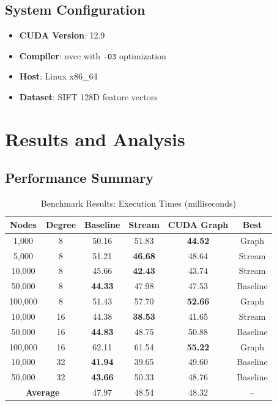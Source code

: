 \documentclass[11pt,a4paper]{article}
\begin{document}
\subsection{System Configuration}

\begin{tcolorbox}[colback=gray!5!white,colframe=gray!75!black,title=Test Environment]
\begin{itemize}
    \item \textbf{CUDA Version}: 12.9
    \item \textbf{Compiler}: nvcc with \texttt{-O3} optimization
    \item \textbf{Host}: Linux x86\_64
    \item \textbf{Dataset}: SIFT 128D feature vectors
\end{itemize}
\end{tcolorbox}

\section{Results and Analysis}

\subsection{Performance Summary}

\begin{table}[H]
\centering
\caption{Benchmark Results: Execution Times (milliseconds)}
\small
\begin{tabular}{@{}cccccc@{}}
\toprule
\textbf{Nodes} & \textbf{Degree} & \textbf{Baseline} & \textbf{Stream} & \textbf{CUDA Graph} & \textbf{Best} \\ \midrule
1,000      & 8  & 50.16 & 51.83 & \textbf{44.52} & Graph   \\
5,000      & 8  & 51.21 & \textbf{46.68} & 48.64 & Stream  \\
10,000     & 8  & 45.66 & \textbf{42.43} & 43.74 & Stream  \\
50,000     & 8  & \textbf{44.33} & 47.98 & 47.53 & Baseline \\
100,000    & 8  & 51.43 & 57.70 & \textbf{52.66} & Graph   \\
10,000     & 16 & 44.38 & \textbf{38.53} & 41.65 & Stream  \\
50,000     & 16 & \textbf{44.83} & 48.75 & 50.88 & Baseline \\
100,000    & 16 & 62.11 & 61.54 & \textbf{55.22} & Graph   \\
10,000     & 32 & \textbf{41.94} & 39.65 & 49.60 & Baseline \\
50,000     & 32 & \textbf{43.66} & 50.33 & 48.76 & Baseline \\
\midrule
\multicolumn{2}{c}{\textbf{Average}} & 47.97 & 48.54 & 48.32 & -- \\
\bottomrule
\end{tabular}
\end{table}
\end{document}
